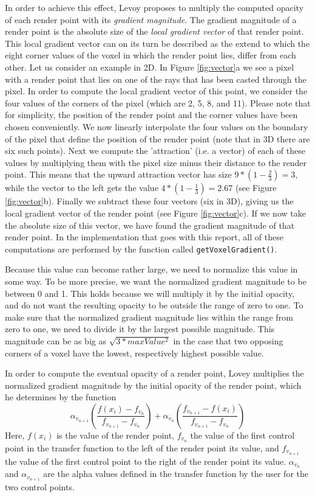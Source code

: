 In order to achieve this effect, Levoy proposes to multiply the computed opacity of each render point with its \textit{gradient magnitude}. The gradient magnitude of a render point is the absolute size of the \textit{local gradient vector} of that render point. This local gradient vector can on its turn be described as the extend to which the eight corner values of the voxel in which the render point lies, differ from each other. Let us consider an example in 2D. In Figure \ref{fig:vector}a we see a pixel with a render point that lies on one of the rays that has been casted through the pixel. In order to compute the local gradient vector of this point, we consider the four values of the corners of the pixel (which are 2, 5, 8, and 11). Please note that for simplicity, the position of the render point and the corner values have been chosen conveniently. We now linearly interpolate the four values on the boundary of the pixel that define the position of the render point (note that in 3D there are six such points). Next we compute the 'attraction' (i.e. a vector) of each of these values by multiplying them with the pixel size minus their distance to the render point. This means that the upward attraction vector has size $9*(1-\frac{2}{3})=3$, while the vector to the left gets the value $4*(1-\frac{1}{3})=2.67$ (see Figure \ref{fig:vector}b). Finally we subtract these four vectors (six in 3D), giving us the local gradient vector of the render point (see Figure \ref{fig:vector}c). If we now take the absolute size of this vector, we have found the gradient magnitude of that render point. In the implementation that goes with this report, all of these computations are performed by the function called \texttt{getVoxelGradient()}.

Because this value can become rather large, we need to normalize this value in some way. To be more precise, we want the normalized gradient magnitude to be between 0 and 1. This holds because we will multiply it by the initial opacity, and do not want the resulting opacity to be outside the range of zero to one. To make sure that the normalized gradient magnitude lies within the range from zero to one, we need to divide it by the largest possible magnitude. This magnitude can be as big as $\sqrt{3*maxValue^2}$ in the case that two opposing corners of a voxel have the lowest, respectively highest possible value.

In order to compute the eventual opacity of a render point, Lovey multiplies the normalized gradient magnitude by the initial opacity of the render point, which he determines by the function
\[
\alpha_{v_{n+1}} \left(\frac{f(x_i)-f_{v_n}}{f_{v_{n+1}}-f_{v_n}}\right) + \alpha_{v_n} \left(\frac{f_{v_{n+1}}-f(x_i)}{f_{v_{n+1}}-f_{v_n}}\right)
\]
 Here, $f(x_i)$ is the value of the render point, $f_{v_n}$ the value of the first control point in the transfer function to the left of the render point its value, and $f_{v_{n+1}}$ the value of the first control point to the right of the render point its value. $\alpha_{v_n}$ and $\alpha_{v_{n+1}}$ are the alpha values defined in the transfer function by the user for the two control points.



